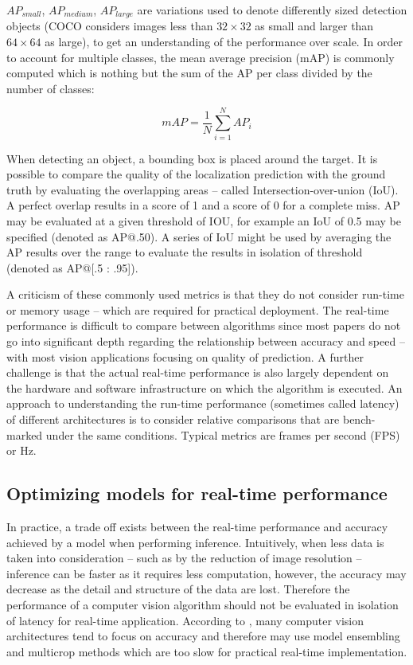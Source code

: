 \documentclass[a4paper,twoside,12pt]{report}
\begin{document}
$AP_{small}$, $AP_{medium}$, $AP_{large}$ are variations used to denote differently sized detection objects (COCO considers images less than $32 \times 32$ as small and larger than $64 \times 64$ as large), to get an understanding of the performance over scale. In order to account for multiple classes, the mean average precision (mAP) is commonly computed which is nothing but the sum of the AP per class divided by the number of classes:

\begin{equation}
mAP = \frac{1}{N}\sum_{i=1}^{N} AP_{i}
\end{equation}

When detecting an object, a bounding box is placed around the target. It is possible to compare the quality of the localization prediction with the ground truth by evaluating the overlapping areas -- called Intersection-over-union (IoU). A perfect overlap results in a score of 1 and a score of 0 for a complete miss. AP may be evaluated at a given threshold of IOU, for example an IoU of 0.5 may be specified (denoted as AP@.50). A series of IoU might be used by averaging the AP results over the range to evaluate the results in isolation of threshold (denoted as AP@[.5 : .95]).  \citep{pmetrics}

A criticism of these commonly used metrics is that they do not consider run-time or memory usage -- which are required for practical deployment. The real-time performance is difficult to compare between algorithms since most papers do not go into significant depth regarding the relationship between accuracy and speed \citep{speedacc} -- with most vision applications focusing on quality of prediction. A further challenge is that the actual real-time performance is also largely dependent on the hardware and software infrastructure on which the algorithm is executed. An approach to understanding the run-time performance (sometimes called latency) of different architectures is to consider relative comparisons that are bench-marked under the same conditions. Typical metrics are frames per second (FPS) or Hz.

\newpage
\subsection{Optimizing models for real-time performance}

In practice, a trade off exists between the real-time performance and accuracy achieved by a model when performing inference. Intuitively, when less data is taken into consideration -- such as by the reduction of image resolution -- inference can be faster as it requires less computation, however, the accuracy may decrease as the detail and structure of the data are lost. Therefore the performance of a computer vision algorithm should not be evaluated in isolation of latency for real-time application. According to \cite{speedacc}, many computer vision architectures tend to focus on accuracy and therefore may use model ensembling and multicrop methods which are too slow for practical real-time implementation.
\end{document}
